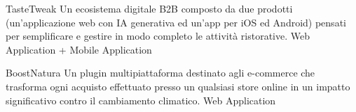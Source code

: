 
\begin{projects}
    \project
    {TasteTweak}{}
    {}
    {Un ecosistema digitale B2B composto da due prodotti (un'applicazione web con IA generativa ed un'app per iOS ed Android) pensati per semplificare e gestire in modo completo le attività ristorative.}
    {Web Application + Mobile Application}

    \project
    {BoostNatura}{}
    {}
    {Un plugin multipiattaforma destinato agli e-commerce che trasforma ogni acquisto effettuato presso un qualsiasi store online in un impatto significativo contro il cambiamento climatico.}
    {Web Application}


\end{projects}
